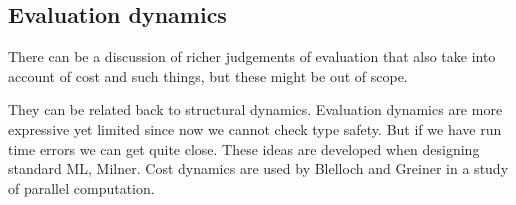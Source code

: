\subsection{Evaluation dynamics}

There can be a discussion of richer judgements of evaluation that also take into account of cost and such things, but these might be out of scope.

They can be related back to structural dynamics. Evaluation dynamics are more expressive yet limited since now we cannot check type safety. But if we have run time errors we can get quite close. These ideas are developed when designing standard ML, Milner. Cost dynamics are used by Blelloch and Greiner in a study of parallel computation.





